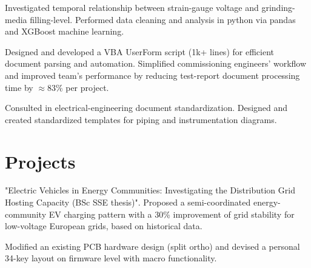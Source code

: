 \documentclass[]{plushcv}
\begin{document}
\begin{minipage}[t]{0.70\textwidth}
	\begin{tightemize}
		\item Investigated temporal relationship between strain-gauge voltage and grinding-media filling-level. Performed data cleaning and analysis in python via pandas and XGBoost machine learning.
		\item Designed and developed a VBA UserForm script (1k+ lines) for efficient document parsing and automation. Simplified commissioning engineers' workflow and improved team's performance by reducing test-report document processing time by $\approx$83\% per project. 
		\item Consulted in electrical-engineering document standardization. Designed and created standardized templates for piping and instrumentation diagrams.
	\end{tightemize}



\section{Projects}
	\begin{tightemize}
	\item "Electric Vehicles in Energy Communities: Investigating the Distribution Grid Hosting Capacity (BSc SSE thesis)".	Proposed a semi-coordinated energy-community EV charging pattern with a 30\% improvement of grid stability for low-voltage European grids, based on historical data.
	\end{tightemize}
	\sectionsep
	
	\begin{tightemize}
	\item Modified an existing PCB hardware design (split ortho) and devised a personal 34-key layout on firmware level with macro functionality.
	\end{tightemize}
	\sectionsep




\end{minipage} \hfill
\end{document}
